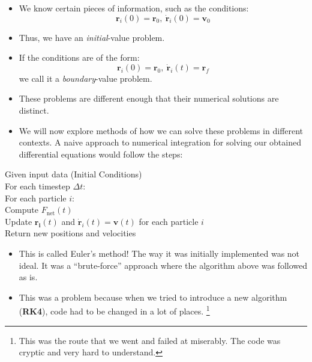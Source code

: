\documentclass[11pt]{article}
\begin{document}
    \begin{itemize}
        \item We know certain pieces of information, such as the conditions:
        \[ \mathbf{r}_i(0) = \mathbf{r}_0,\ \mathbf{\dot{r}}_i(0) = \mathbf{v}_0 \]
        \item Thus, we have an \emph{initial}-value problem.

        \item If the conditions are of the form:
        \[ \mathbf{r}_i(0) = \mathbf{r}_0,\ \mathbf{\dot{r}}_i(t) = \mathbf{r}_f \]
        \noindent
        we call it a \emph{boundary}-value problem.

        \item These problems are different enough that their numerical solutions are distinct.

        \item We will now explore methods of how we can solve these problems in different contexts.
        A naive approach to numerical integration for solving our obtained differential equations would follow the steps:
    \end{itemize}

    \noindent
    \indent \indent Given input data (Initial Conditions) \\
    \indent \indent \indent For each timestep $\Delta t$: \\
    \indent \indent \indent \indent For each particle $i$: \\
    \indent \indent \indent \indent \indent Compute $F_{\text{net}}(t)$ \\
    \indent \indent \indent \indent \indent Update $\mathbf{r_i}(t)$ and $\mathbf{\dot{r}}_i(t) = \mathbf{v}(t)$ for each particle $i$ \\
    \indent \indent \indent \indent \indent Return new positions and velocities

    \begin{itemize}
        \item This is called Euler's method! The way it was initially implemented was not ideal. It was a ``brute-force'' approach where the algorithm above was followed as is.
        \item This was a problem because when we tried to introduce a new algorithm (\textbf{RK4}), code had to be changed in a lot of places. \footnote{This was the route that we went and failed at miserably. The code was cryptic and very hard to understand.}
    \end{itemize}
\end{document}

